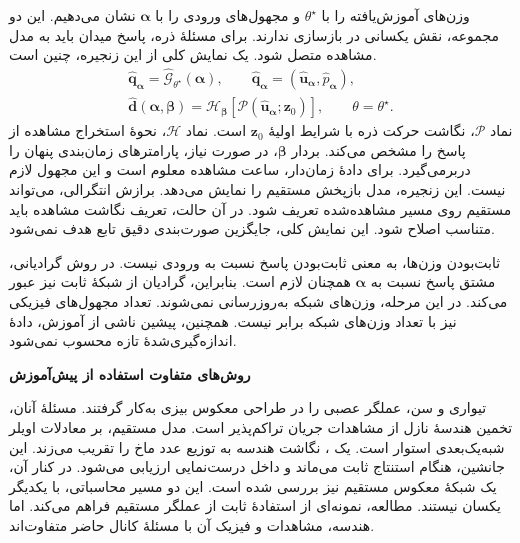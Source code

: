 وزن‌های آموزش‌یافته را با $\theta^\star$ و مجهول‌های ورودی را با $\boldsymbol\alpha$ نشان می‌دهیم.
این دو مجموعه، نقش یکسانی در بازسازی ندارند.
برای مسئلهٔ ذره، پاسخ میدان باید به مدل مشاهده متصل شود.
یک نمایش کلی از این زنجیره، چنین است.
\begin{equation}
\begin{gathered}
\widehat{\mathbf q}_{\boldsymbol\alpha}
=\widehat{\mathcal G}_{\theta^\star}(\boldsymbol\alpha),
\qquad
\widehat{\mathbf q}_{\boldsymbol\alpha}=(\widehat{\mathbf u}_{\boldsymbol\alpha},
\widehat p_{\boldsymbol\alpha}),\\
\widehat{\mathbf d}(\boldsymbol\alpha,\boldsymbol\beta)
=\mathcal H_{\boldsymbol\beta}
\!\left[\mathcal P(\widehat{\mathbf u}_{\boldsymbol\alpha};\mathbf z_0)\right],
\qquad \theta=\theta^\star.
\end{gathered}
\label{eq:lit-frozen-observation-chain}
\end{equation}
نماد $\mathcal P$، نگاشت حرکت ذره با شرایط اولیهٔ $\mathbf z_0$ است.
نماد $\mathcal H$، نحوهٔ استخراج مشاهده از پاسخ را مشخص می‌کند.
بردار $\boldsymbol\beta$، در صورت نیاز، پارامترهای زمان‌بندی پنهان را دربرمی‌گیرد.
برای دادهٔ زمان‌دار، ساعت مشاهده معلوم است و این مجهول لازم نیست.
این زنجیره، مدل بازپخش مستقیم را نمایش می‌دهد.
برازش انتگرالی، می‌تواند مستقیم روی مسیر مشاهده‌شده تعریف شود.
در آن حالت، تعریف نگاشت مشاهده باید متناسب اصلاح شود.
این نمایش کلی، جایگزین صورت‌بندی دقیق تابع هدف نمی‌شود.

ثابت‌بودن وزن‌ها، به معنی ثابت‌بودن پاسخ نسبت به ورودی نیست.
در روش گرادیانی، مشتق پاسخ نسبت به $\boldsymbol\alpha$ همچنان لازم است.
بنابراین، گرادیان از شبکهٔ ثابت نیز عبور می‌کند.
در این مرحله، وزن‌های شبکه به‌روزرسانی نمی‌شوند.
تعداد مجهول‌های فیزیکی نیز با تعداد وزن‌های شبکه برابر نیست.
همچنین، پیشین ناشی از آموزش، دادهٔ اندازه‌گیری‌شدهٔ تازه محسوب نمی‌شود.

\textbf{روش‌های متفاوت استفاده از پیش‌آموزش}

تیواری و سن، عملگر عصبی را در طراحی معکوس بیزی به‌کار گرفتند.
مسئلهٔ آنان، تخمین هندسهٔ نازل از مشاهدات جریان تراکم‌پذیر است.
مدل مستقیم، بر معادلات اویلر شبه‌یک‌بعدی استوار است.
یک ، نگاشت هندسه به توزیع عدد ماخ را تقریب می‌زند.
این جانشین، هنگام استنتاج ثابت می‌ماند و داخل درست‌نمایی ارزیابی می‌شود.
در کنار آن، یک شبکهٔ معکوس مستقیم نیز بررسی شده است.
این دو مسیر محاسباتی، با یکدیگر یکسان نیستند.
مطالعه، نمونه‌ای از استفادهٔ ثابت از عملگر مستقیم فراهم می‌کند.
اما هندسه، مشاهدات و فیزیک آن با مسئلهٔ کانال حاضر متفاوت‌اند.
\cite{Tiwari2026BayesianCFD}

